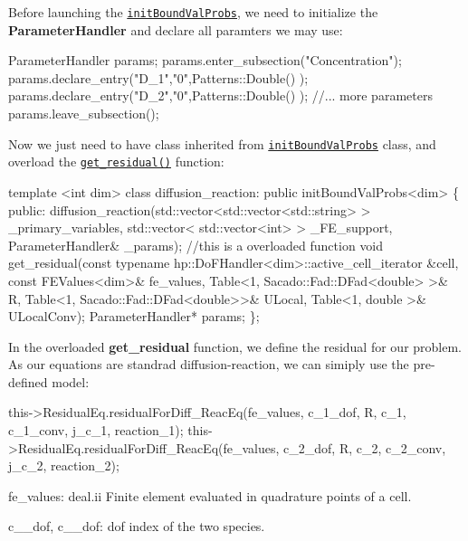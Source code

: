  Before launching the \href{../html/classinit_bound_val_probs.html}{\tt init\-Bound\-Val\-Probs}, we need to initialize the {\bfseries Parameter\-Handler} and declare all paramters we may use\-: 
\begin{DoxyCode}
ParameterHandler params;
params.enter\_subsection(\textcolor{stringliteral}{"Concentration"});   
params.declare\_entry(\textcolor{stringliteral}{"D\_1"},\textcolor{stringliteral}{"0"},Patterns::Double() );
params.declare\_entry(\textcolor{stringliteral}{"D\_2"},\textcolor{stringliteral}{"0"},Patterns::Double() );
\textcolor{comment}{//... more parameters }
params.leave\_subsection();  
\end{DoxyCode}
 Now we just need to have class inherited from \href{../html/classinit_bound_val_probs.html}{\tt init\-Bound\-Val\-Probs} class, and overload the \href{../html/classinit_bound_val_probs.html#ac8f2c3e2a1040c70b709900dc3dfdaea}{\tt get\-\_\-residual()} function\-: 
\begin{DoxyCode}
\textcolor{keyword}{template} <\textcolor{keywordtype}{int} dim>
\textcolor{keyword}{class }diffusion\_reaction: \textcolor{keyword}{public} initBoundValProbs<dim>
\{
    \textcolor{keyword}{public}:
        diffusion\_reaction(std::vector<std::vector<std::string> > \_primary\_variables, std::vector<
      std::vector<int> > \_FE\_support, ParameterHandler& \_params);
        \textcolor{comment}{//this is a overloaded function }
        \textcolor{keywordtype}{void} get_residual(\textcolor{keyword}{const} \textcolor{keyword}{typename} hp::DoFHandler<dim>::active\_cell\_iterator &cell, \textcolor{keyword}{const} 
      FEValues<dim>& fe\_values, Table<1, Sacado::Fad::DFad<double> >& R, Table<1, Sacado::Fad::DFad<double>>& ULocal, 
      Table<1, double >& ULocalConv);
        ParameterHandler* params;       
\};
\end{DoxyCode}
 In the overloaded {\bfseries get\-\_\-residual} function, we define the residual for our problem. As our equations are standrad diffusion-\/reaction, we can simiply use the pre-\/defined model\-: 
\begin{DoxyCode}
this->ResidualEq.residualForDiff_ReacEq(fe\_values, c\_1\_dof, R, c\_1, c\_1\_conv, j\_c\_1, reaction\_1);
this->ResidualEq.residualForDiff_ReacEq(fe\_values, c\_2\_dof, R, c\_2, c\_2\_conv, j\_c\_2, reaction\_2);
\end{DoxyCode}
 fe\-\_\-values\-: deal.\-ii Finite element evaluated in quadrature points of a cell.

c\-\_\-\_\-dof, c\-\_\-\_\-dof\-: dof index of the two species.

